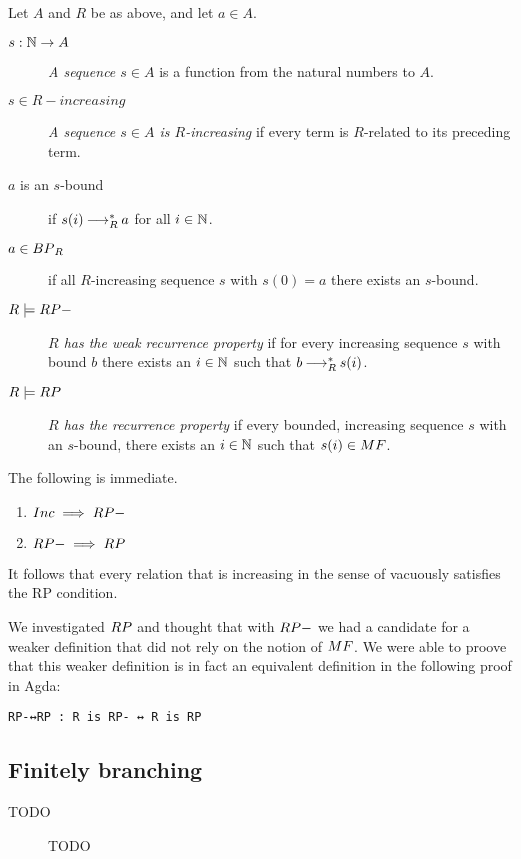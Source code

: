 \begin{definition} Let $A$ and $R$ be as above, and let $a \in A$.
    \begin{description}
        \item[$s : \mathbb{N} \to A$] \emph{A sequence $s \in A$} is a function from the natural numbers to $A$.  
        \item[$s \in R-increasing$] \emph{A sequence $s \in A$ is $R$-increasing} if every term is $R$-related to its preceding term.
        \item[$a$ is an $s$-bound] if $s (i) \mathbin{\longrightarrow_R^*} a$ for all $i \in \mathbb{N}$. 
        \item[$a \in \BP_R$] if all $R$-increasing sequence $s$ with $s (0) = a$ there exists an $s$-bound. 
        \item[$R \models \RPm$] \emph{$R$ has the weak recurrence property} if for every increasing sequence $s$ with bound $b$ there exists an $i \in \mathbb{N}$ such that $b \mathbin{\longrightarrow_R^*} s (i)$.
        \item[$R \models \RP$] \emph{$R$ has the recurrence property} if every bounded, increasing sequence $s$ with an $s$-bound, there exists an $i \in \mathbb{N}$ such that 
        $s (i) \in \MF$.
    \end{description}
\end{definition}


The following is immediate.
\begin{proposition}\hfill 
    \begin{enumerate}
        \item $\Inc \implies \RPm$
        \item $\RPm \implies \RP$
    \end{enumerate}
\end{proposition}


It follows that every relation that is increasing in the sense of \terese
vacuously satisfies the RP condition.

We investigated $\RP$ and thought that with $\RPm$ we had a candidate for a weaker definition that 
did not rely on the notion of $\MF$. We were able to proove that this weaker definition is 
in fact an equivalent definition in the following proof in Agda: 

\verb|RP-↔RP : R is RP- ↔ R is RP| \footnotemark[1]


\subsection{Finitely branching}
\begin{definition}
    \begin{description}
        \item[TODO] TODO 
    \end{description}
\end{definition}
